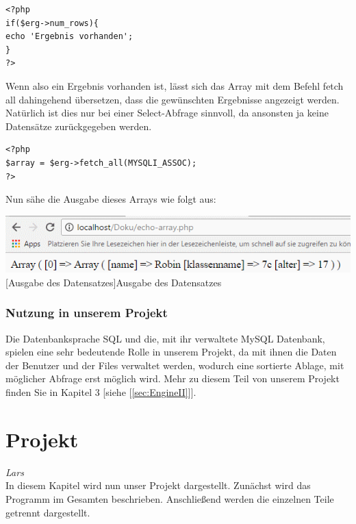 \documentclass[12pt,a4paper,bibliography=totocnumbered,listof=totocnumbered]{scrartcl}
\begin{document}
\vspace{1em}
\begin{lstlisting}[caption= SQL PHP NumRows, label=lst:sql-php-numrows]
<?php
if($erg->num_rows){
echo 'Ergebnis vorhanden';
}
?>
\end{lstlisting}

Wenn also ein Ergebnis vorhanden ist, lässt sich das Array mit dem Befehl \glqq fetch all\grqq{} dahingehend übersetzen, dass die gewünschten Ergebnisse angezeigt werden.
Natürlich ist dies nur bei einer \glqq Select-Abfrage\grqq{} sinnvoll, da ansonsten ja keine Datensätze zurückgegeben werden.

\vspace{1em}
\begin{lstlisting}[caption= SQL PHP Mysqli, label=lst:sql-php-mysqli]
<?php
$array = $erg->fetch_all(MYSQLI_ASSOC);
?>
\end{lstlisting}

Nun sähe die Ausgabe dieses Arrays wie folgt aus:

\vspace{1em}
\begin{minipage}{\linewidth}
	\centering
	\includegraphics[width=0.7\linewidth]{Bilder/sql-php-print-daten.png}
	[Ausgabe des Datensatzes]{Ausgabe des Datensatzes}
	\label{fig:datenausgabe}
\end{minipage}

\subsubsection{Nutzung in unserem Projekt}
Die Datenbanksprache SQL und die, mit ihr verwaltete MySQL Datenbank, spielen eine sehr bedeutende Rolle in unserem Projekt, da mit ihnen die Daten der Benutzer und der Files verwaltet werden, wodurch eine sortierte Ablage, mit möglicher Abfrage erst möglich wird.
Mehr zu diesem Teil von unserem Projekt finden Sie in Kapitel 3 [siehe [\ref{sec:EngineII}]].

\pagebreak

\section{Projekt}
\label{sec:Projekt}
\emph{Lars}\\
In diesem Kapitel wird nun unser Projekt dargestellt. Zunächst wird das Programm im Gesamten beschrieben. Anschließend werden die einzelnen Teile getrennt dargestellt.
\end{document}

